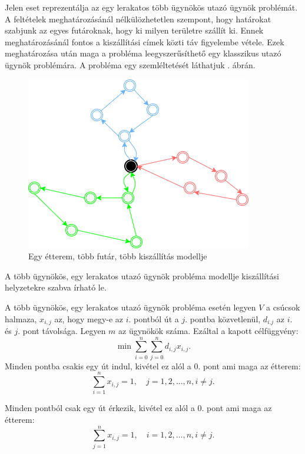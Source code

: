 

Jelen eset reprezentálja az egy lerakatos több ügynökös utazó ügynök problémát. A feltételek meghatározásánál nélkülözhetetlen szempont, hogy határokat szabjunk az egyes futároknak, hogy ki milyen területre szállít ki. Ennek meghatározásánál fontos a kiszállítási címek közti táv figyelembe vétele. Ezek meghatározása után maga a probléma leegyszerűsíthető egy klasszikus utazó ügynök problémára.
A probléma egy szemléltetését láthatjuk . ábrán.

\begin{figure}[h!]
\centering
\includegraphics[scale=0.7]{images/Onedepotmtsp.png}
\caption{Egy étterem, több futár, több kiszállítás modellje}
\label{fig:model4}
\end{figure}


A több ügynökös, egy lerakatos utazó ügynök probléma modellje kiszállítási helyzetekre szabva írható le.

A több ügynökös, egy lerakatos utazó ügynök probléma esetén legyen $V$ a csúcsok halmaza, $x_{i,j}$ az, hogy megy-e az $i.$ pontból út a $j.$ pontba közvetlenül, $d_{i.j}$ az $i.$ és $j.$ pont távolsága. Legyen $m$ az ügynökök száma. Ezáltal a kapott célfüggvény:
\[
\displaystyle
\min \sum_{i=0}^n \sum_{j=0}^n d_{i,j} x_{i,j}.
\]
Minden pontba csakis egy út indul, kivétel ez alól a 0. pont ami maga az étterem:
\[
\displaystyle
\sum_{i=1}^n x_{i,j} = 1, \quad j = 1, 2, \ldots, n, i \neq j.
\]

Minden pontból csak egy út érkezik, kivétel ez alól a 0. pont ami maga az étterem:
\[
\displaystyle
\sum_{j=1}^n x_{i,j} = 1, \quad i = 1, 2, \ldots, n, i \neq j.
\]

